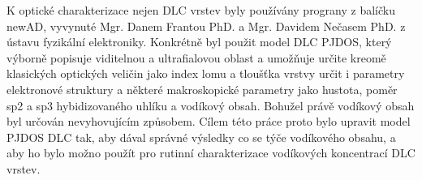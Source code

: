 K optické charakterizace nejen DLC vrstev byly používány prograny z balíčku newAD, vyvynuté Mgr. Danem Frantou PhD. a Mgr. Davidem Nečasem PhD. z ústavu fyzikální elektroniky. Konkrétně byl použit model DLC PJDOS, který výborně popisuje viditelnou a ultrafialovou oblast a umožňuje určite kreomě klasických optických veličin jako index lomu a tloušťka vrstvy určit i parametry elektronové struktury a některé makroskopické parametry jako hustota, poměr sp2 a sp3 hybidizovaného uhlíku a vodíkový obsah. Bohužel právě vodíkový obsah byl určován nevyhovujícím způsobem. Cílem této práce proto bylo upravit model PJDOS DLC tak, aby dával správné výsledky co se týče vodíkového obsahu, a aby ho bylo možno použít pro rutinní charakterizace vodíkových koncentrací DLC vrstev.   
 
\cleardoublepage

